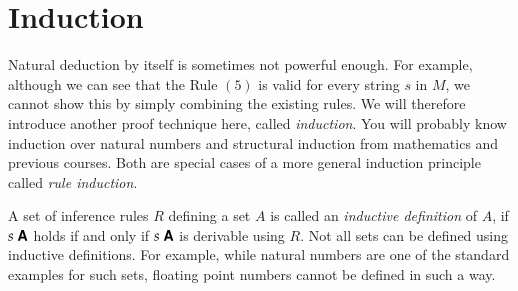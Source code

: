\documentclass{book}
\begin{document}
\section{Induction} 

Natural deduction by itself is sometimes not powerful enough. For example,
although we can see that the Rule $(5)$ is valid for every string $s$
in $M$, we cannot show this by simply combining the existing rules. We will
therefore introduce another proof technique here, called \emph{induction}. You
will probably know induction over natural numbers and structural induction
from mathematics and previous courses. Both are special cases of a more
general induction principle called \emph{rule induction}. 


A set of inference rules $R$ defining a set $A$ is called an \emph{inductive
  definition} of $A$, if ${s}\;\textsf{\textbf{A}}$ holds if and only if ${s}\;\textsf{\textbf{A}}$ is
derivable using $R$. Not all sets can be defined using inductive
definitions. For example, while natural numbers are one of the standard
examples for such sets, floating point numbers cannot be defined in such a
way. 
\end{document}
